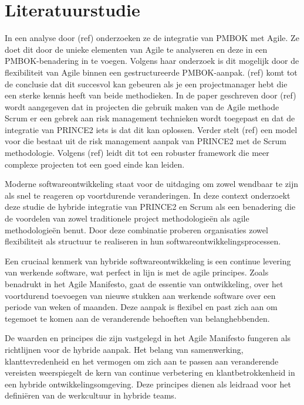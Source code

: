 \documentclass[dutch]{hogent-article}
\begin{document}
\section{Literatuurstudie}%
\label{sec:literatuurstudie}
In een analyse door (ref) onderzoeken ze de integratie van PMBOK met Agile.
Ze doet dit door de unieke elementen van Agile te analyseren en deze in een PMBOK-benadering in te voegen.
Volgens haar onderzoek is dit mogelijk door de flexibiliteit van Agile binnen een gestructureerde PMBOK-aanpak.
(ref) komt tot de conclusie dat dit succesvol kan gebeuren als je een projectmanager hebt die een sterke kennis heeft van beide methodieken.
\newline
In de paper geschreven door (ref) wordt aangegeven dat in projecten die gebruik maken van de Agile methode Scrum er een gebrek
aan risk management technieken wordt toegepast en dat de integratie van PRINCE2 iets is dat dit kan oplossen.
Verder stelt (ref) een model voor die bestaat uit de risk management aanpak van PRINCE2 met de Scrum methodologie.
Volgens  (ref) leidt dit tot een robuster framework die meer complexe projecten tot een goed einde kan leiden.
\newline





Moderne softwareontwikkeling staat voor de uitdaging om zowel wendbaar te zijn als snel te reageren op voortdurende veranderingen. In deze context onderzoekt deze studie de hybride integratie van PRINCE2 en Scrum als een benadering die de voordelen van zowel traditionele project methodologieën als agile methodologieën benut. Door deze combinatie proberen organisaties zowel flexibiliteit als structuur te realiseren in hun softwareontwikkelingsprocessen.
\newline

Een cruciaal kenmerk van hybride softwareontwikkeling is een continue levering van werkende software, wat perfect in lijn is met de agile principes. Zoals \textcite{PoniszewskaMaranda2022} benadrukt in het Agile Manifesto, gaat de essentie van ontwikkeling, over het voortdurend toevoegen van nieuwe stukken aan werkende software over een periode van weken of maanden. Deze aanpak is flexibel en past zich aan om tegemoet te komen aan de veranderende behoeften van belanghebbenden.
\newline

De waarden en principes die zijn vastgelegd in het Agile Manifesto fungeren als richtlijnen voor de hybride aanpak. Het belang van samenwerking, klanttevredenheid en het vermogen om zich aan te passen aan veranderende vereisten \textcite{Fowler2020} weerspiegelt de kern van continue verbetering en klantbetrokkenheid in een hybride ontwikkelingsomgeving. Deze principes dienen als leidraad voor het definiëren van de werkcultuur in hybride teams.
\newline
\end{document}
